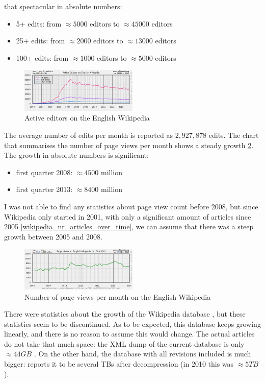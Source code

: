 \documentclass[12pt]{report}
\begin{document}
that spectacular in absolute numbers:
\begin{itemize}
\item 5+ edits: from $\approx 5000$ editors to $\approx 45000$ editors
\item 25+ edits: from $\approx 2000$ editors to $\approx 13000$ editors
\item 100+ edits: from $\approx 1000$ editors to $\approx 5000$ editors
\end{itemize}
\begin{figure}[h!]
  \caption{Active editors on the English Wikipedia}
  \label{wikipedia_active_editors}
  \centering
    \includegraphics[width=0.5\textwidth]{pics/wikipedia_active_editors.png}
\end{figure}
The average number of edits per month is reported as $2,927,878$
edits.
The chart that summarises the number of page views per month shows 
a steady growth \ref{wikipedia_page_views}. The growth in absolute
numbers is significant:
\begin{itemize}
\item first quarter 2008: $\approx 4500$ million
\item first quarter 2013: $\approx 8400$ million
\end{itemize}
I was not able to find any statistics about page view count before
2008, but since Wikipedia only started in 2001, with only a
significant amount of articles since 2005 \ref{wikipedia_nr_articles_over_time}, we can assume that there
was a steep growth between 2005 and 2008.
\begin{figure}[h!]
  \caption{Number of page views per month on the English Wikipedia}
  \label{wikipedia_page_views}
  \centering
    \includegraphics[width=0.5\textwidth]{pics/wikipedia_page_views.png}
\end{figure}
There were statistics about the growth of the Wikipedia database
\cite{wikipedia_database_growth}, but these statistics seem to be
discontinued. As to be expected, this database keeps growing linearly,
and there is no reason to assume this would change.
The actual articles do not take that much space: the XML dump of the
current database is only $\approx 44 GB$ \cite{wikipedia_size}. 
On the other hand, the database with all
revisions included is much bigger: \cite{wikipedia_size} reports it to be several
TBs after decompression (in 2010 this was $\approx 5TB$ \cite{wikipedia_full_size}).
\end{document}
